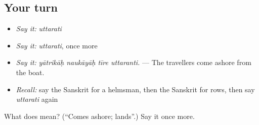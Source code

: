 \subsection*{Your turn}
\begin{itemize}
\raggedright
  \item \emph{Say it:} \emph{uttarati}
  \item \emph{Say it:} \emph{uttarati}, once more
  \item \emph{Say it:} \emph{yātrikāḥ naukāyāḥ tīre uttaranti.} — The travellers come ashore from the boat.
  \item \emph{Recall:} say the Sanskrit for a helmsman, then the Sanskrit for rows, then say \emph{uttarati} again
\end{itemize}

\begin{tcolorbox}[breakable,colback=teal!4,colframe=teal!35!black,title={Before you move on}]
What does  mean? (\textquotedblleft{}Comes ashore; lands\textquotedblright{}.) Say it once more.
\end{tcolorbox}
